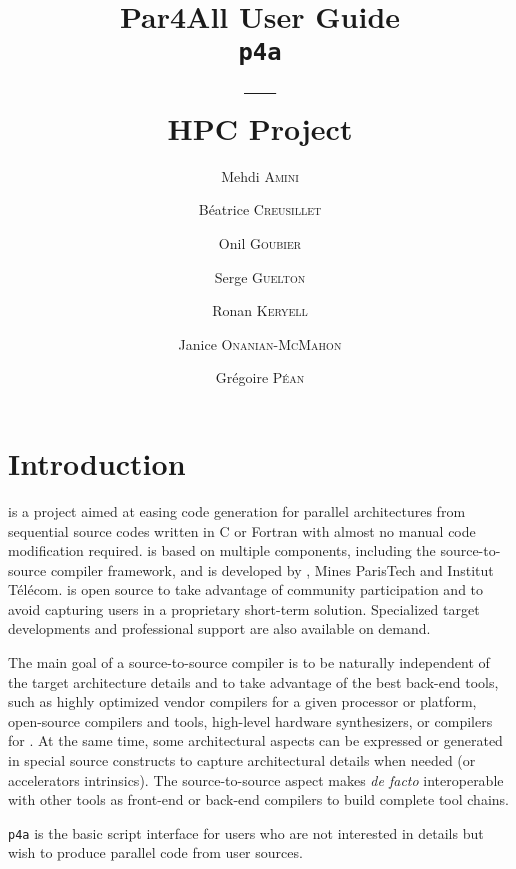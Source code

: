 \documentclass[a4paper]{article}
\begin{document}
\title{Par4All User Guide\\
  \texttt{p4a}\\
  ---\\
  HPC Project}

\author{Mehdi \textsc{Amini} \and Béatrice \textsc{Creusillet} \and Onil
  \textsc{Goubier} \and Serge \textsc{Guelton} \and Ronan \textsc{Keryell} \and
  Janice \textsc{Onanian-McMahon} \and Grégoire \textsc{Péan}}

\maketitle

\tableofcontents{}



\section{Introduction}
\label{sec:introduction}

\Apfa is a project aimed at easing code generation for parallel
architectures from sequential source codes written in C or Fortran with
almost no manual code modification required. \Apfa is based on multiple
components, including the \Apips source-to-source compiler framework, and is
developed by \Ahpcp, Mines ParisTech and Institut Télécom. \Apfa is
open source to take advantage of community participation and to avoid
capturing users in a proprietary short-term solution. Specialized target
developments and professional support are also available on demand.

The main goal of a source-to-source compiler is to be naturally
independent of the target architecture details and to take advantage
of the best
back-end tools, such as highly optimized vendor compilers for a given
processor or platform, open-source compilers and tools, high-level
hardware synthesizers, \Acuda or \Aopencl compilers for \Agpu. At the same
time, some architectural aspects can be expressed or generated in
special source constructs to capture architectural details when needed
(\Asimd or accelerators intrinsics). The source-to-source aspect makes
\Apfa \emph{de facto} interoperable with other tools as front-end
or back-end compilers to build complete tool chains.

\texttt{p4a} is the basic script interface for users who are
not interested in \Apips details but wish to produce parallel code from
user sources.
\end{document}
